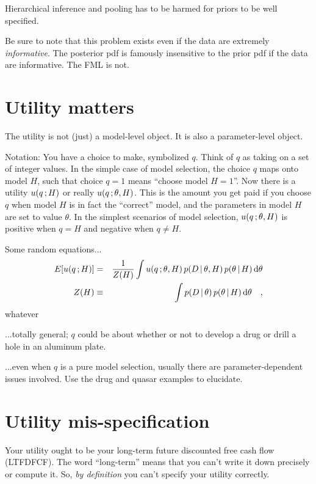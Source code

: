 \documentclass[12pt,twoside]{article}
\begin{document}
Hierarchical inference and pooling has to be harmed for priors to be well specified.

Be sure to note that this problem exists even if the data are extremely \emph{informative}.
The posterior pdf is famously insensitive to the prior pdf if the data are informative.
The FML is not.

\section{Utility matters}

The utility is not (just) a model-level object.
It is also a parameter-level object.

Notation: You have a choice to make, symbolized $q$.
Think of $q$ as taking on a set of integer values.
In the simple case of model selection,
  the choice $q$ maps onto model $H$,
  such that choice $q=1$ means ``choose model $H=1$''.
Now there is a utility $u(q\,; H)$ or really $u(q\,;\theta,H)$.
This is the amount you get paid if you choose $q$ when model $H$ is in fact the ``correct'' model,
  and the parameters in model $H$ are set to value $\theta$.
In the simplest scenarios of model selection,
  $u(q\,;\theta,H)$ is positive when $q=H$ and negative when $q\neq H$.

Some random equations...
\begin{eqnarray}
E[u(q\,; H)] &=& \frac{1}{Z(H)}\int u(q\,;\theta, H)\,p(D\,|\,\theta,H)\,p(\theta\,|\, H)\,\mathrm{d}\theta
\\
Z(H) &\equiv& \int p(D\,|\,\theta)\,p(\theta\,|\, H)\,\mathrm{d}\theta
\quad ,
\end{eqnarray}
whatever

...totally general; $q$ could be about whether or not to develop a drug or drill a hole in an aluminum plate.

...even when $q$ is a pure model selection, usually there are parameter-dependent issues involved.  Use the drug and quasar examples to elucidate.

\section{Utility mis-specification}

Your utility ought to be your long-term future discounted free cash flow (LTFDFCF).
The word ``long-term'' means that you can't write it down precisely or compute it.
So, \emph{by definition} you can't specify your utility correctly.
\end{document}

